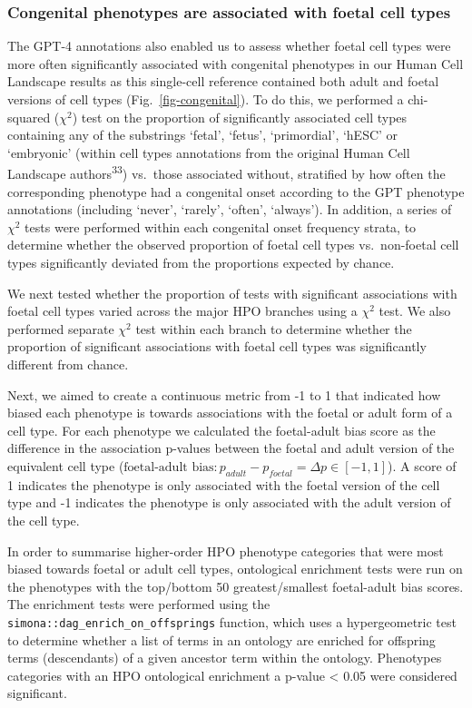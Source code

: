 \documentclass[
]{article}
\begin{document}
\subsubsection{Congenital phenotypes are associated with foetal cell
types}\label{congenital-phenotypes-are-associated-with-foetal-cell-types-1}

The GPT-4 annotations also enabled us to assess whether foetal cell
types were more often significantly associated with congenital
phenotypes in our Human Cell Landscape results as this single-cell
reference contained both adult and foetal versions of cell types
(Fig.~\ref{fig-congenital}). To do this, we performed a chi-squared
(\(\chi^2\)) test on the proportion of significantly associated cell
types containing any of the substrings `fetal', `fetus', `primordial',
`hESC' or `embryonic' (within cell types annotations from the original
Human Cell Landscape authors\textsuperscript{33}) vs.~those associated
without, stratified by how often the corresponding phenotype had a
congenital onset according to the GPT phenotype annotations (including
`never', `rarely', `often', `always'). In addition, a series of
\(\chi^2\) tests were performed within each congenital onset frequency
strata, to determine whether the observed proportion of foetal cell
types vs.~non-foetal cell types significantly deviated from the
proportions expected by chance.

We next tested whether the proportion of tests with significant
associations with foetal cell types varied across the major HPO branches
using a \(\chi^2\) test. We also performed separate \(\chi^2\) test
within each branch to determine whether the proportion of significant
associations with foetal cell types was significantly different from
chance.

Next, we aimed to create a continuous metric from -1 to 1 that indicated
how biased each phenotype is towards associations with the foetal or
adult form of a cell type. For each phenotype we calculated the
foetal-adult bias score as the difference in the association p-values
between the foetal and adult version of the equivalent cell type
(\(\text{foetal-adult bias}: p_{adult} - p_{foetal} = \Delta p \in [-1,1]\)).
A score of 1 indicates the phenotype is only associated with the foetal
version of the cell type and -1 indicates the phenotype is only
associated with the adult version of the cell type.

In order to summarise higher-order HPO phenotype categories that were
most biased towards foetal or adult cell types, ontological enrichment
tests were run on the phenotypes with the top/bottom 50
greatest/smallest foetal-adult bias scores. The enrichment tests were
performed using the \texttt{simona::dag\_enrich\_on\_offsprings}
function, which uses a hypergeometric test to determine whether a list
of terms in an ontology are enriched for offspring terms (descendants)
of a given ancestor term within the ontology. Phenotypes categories with
an HPO ontological enrichment a p-value \textless{} 0.05 were considered
significant.
\end{document}
